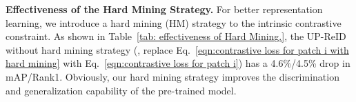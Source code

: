 \documentclass[10pt,twocolumn,letterpaper]{article}
\begin{document}





\noindent\textbf{Effectiveness of the Hard Mining Strategy.} For better representation learning, we introduce a hard mining (HM) strategy to the intrinsic contrastive constraint. As shown in Table~\ref{tab: effectiveness of Hard Mining.}, the UP-ReID without hard mining strategy (\ie, replace Eq.~\ref{eqn:contrastive loss for patch i with hard mining} with Eq.~\ref{eqn:contrastive loss for patch i}) has a 4.6\%/4.5\% drop in mAP/Rank1. Obviously, our hard mining strategy improves the discrimination and generalization capability of the pre-trained model.
\end{document}

